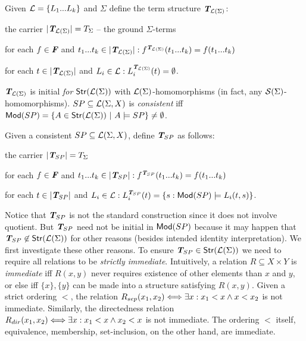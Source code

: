 \documentclass[12pt]{article}
\begin{document}
\begin{Definition}
Given ${{\cal{L}}}=\{L_1...L_k\}$ and $\Sigma$ define the term structure ${\mbox{\bf{\em T}}}_{{{\cal{L}}}(\Sigma)}$:
\begin{enum}
\item the carrier $|{\mbox{\bf{\em T}}}_{{{\cal{L}}}(\Sigma)}|=T_{\Sigma}$ -- the ground $\Sigma$-terms
\item for each $f\in\mbox{\bf{\em F}}$ and $t_1...t_k\in|{\mbox{\bf{\em T}}}_{{{\cal{L}}}(\Sigma)}|:
f^{{\scriptsize{{\mbox{\bf{\em T}}}_{{{\cal{L}}}(\Sigma)}}}}(t_1...t_k) = f(t_1...t_k)$
\item for each $t\in|{\mbox{\bf{\em T}}}_{{{\cal{L}}}(\Sigma)}|$ and $L_i\in{{\cal{L}}}: L_i^{{\scriptsize{{\mbox{\bf{\em T}}}_{{{\cal{L}}}(\Sigma)}}}}(t)=\emptyset$.
\end{enum}
\end{Definition}
${\mbox{\bf{\em T}}}_{{{\cal{L}}}(\Sigma)}$ is initial {\em for} ${\sf {Str}}({{\cal{L}}}(\Sigma))$ with ${{\cal{L}}}(\Sigma)$-homomorphisms (in fact, any
${{\cal{S}}}(\Sigma)$-homomorphisms). $SP\subseteq{{\cal{L}}}(\Sigma,X)$ is {\em consistent} iff 
${\sf {Mod}}(SP)=\{A\in{\sf {Str}}({{\cal{L}}}(\Sigma))\ |\ A\models SP\}\not=\emptyset$.
%
\begin{Definition}
Given a consistent $SP\subseteq{{\cal{L}}}(\Sigma,X)$, define ${\mbox{\bf{\em T}}}_{SP}$ as follows:
\begin{enum}
\item the carrier $|{\mbox{\bf{\em T}}}_{SP}| = T_{\Sigma}$ 
\item for each $f\in\mbox{\bf{\em F}}$ and $t_1...t_k\in|{\mbox{\bf{\em T}}}_{SP}|:
f^{{\scriptsize{{\mbox{\bf{\em T}}}_{SP}}}}(t_1...t_k) = f(t_1...t_k)$
\item for each $t\in|{\mbox{\bf{\em T}}}_{SP}|$ and $L_i\in{{\cal{L}}}:
L_i^{{\scriptsize{{\mbox{\bf{\em T}}}_{SP}}}}(t) = \{s:{\sf {Mod}}(SP)\models L_i(t,s)\}$.
\end{enum}
\end{Definition}
Notice that ${\mbox{\bf{\em T}}}_{SP}$ is not the standard construction since it does not involve
quotient. 
But ${\mbox{\bf{\em T}}}_{SP}$ need not be initial in ${\sf {Mod}}(SP)$ because it may happen that
${\mbox{\bf{\em T}}}_{SP}\not\in{\sf {Str}}({{\cal{L}}}(\Sigma))$ for other reasons (besides intended identity
interpretation). We first investigate these other reasons. 
To ensure ${\mbox{\bf{\em T}}}_{SP}\in{\sf {Str}}({{\cal{L}}}(\Sigma))$ we need to require all relations to
be {\em strictly immediate}. 
Intuitively, a relation $R\subseteq X\times Y$ is {\em immediate} iff 
$R(x,y)$ never requires existence of other elements than $x$ and
$y$, or else iff $\{x\},\{y\}$ can be made into a structure
satisfying $R(x,y)$. 
Given a strict ordering $<$, the relation $R_{sep}(x_1,x_2)\Longleftrightarrow
\exists x: x_1<x\land x<x_2$ is not immediate. Similarly, the directedness relation
$R_{dir}(x_1,x_2)\Longleftrightarrow \exists x: x_1<x\land x_2<x$ is not immediate. 
The ordering $<$ itself, equivalence, membership, set-inclusion, on
the other hand, are immediate.
\end{document}
